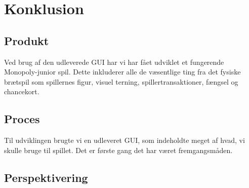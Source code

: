 \section{Konklusion}
\subsection{Produkt}
Ved brug af den udleverede GUI har vi har fået udviklet et fungerende Monopoly-junior spil. Dette inkluderer alle de væsentlige ting fra det fysiske brætspil som spillernes figur, visuel terning, spillertransaktioner, fængsel og chancekort.

\subsection{Proces}
Til udviklingen brugte vi en udleveret GUI, som indeholdte meget af hvad, vi skulle bruge til spillet. Det er første gang det har været fremgangsmåden.

\subsection{Perspektivering}


